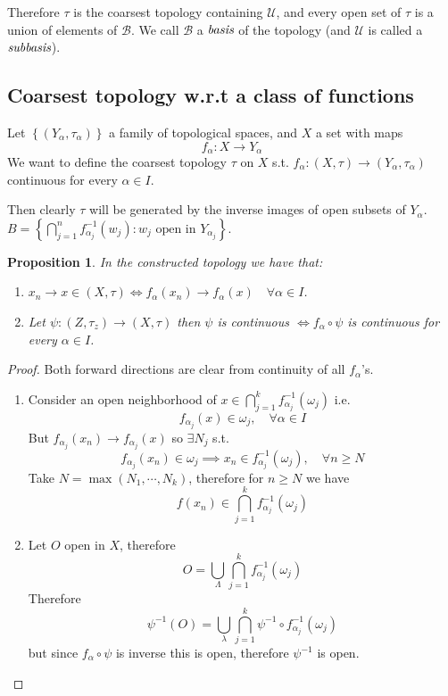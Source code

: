 \documentclass[11pt,a4paper]{article}
\theoremstyle{definition}
\theoremstyle{plain}
\newtheorem{proposition}[definition]{Proposition}
\theoremstyle{remark}
\renewcommand{\set}[1]{\left\{ #1 \right\}}
\newcommand{\1}{\mathbbm{1}}
\begin{document}
Therefore $\tau$ is the coarsest topology containing $\mathcal{U}$, and every open set of $\tau$ is a union of elements of $\mathcal{B}$. We call
$\mathcal{B}$ a $\emph{basis}$ of the topology (and $\mathcal{U}$ is called a $\emph{subbasis}$).

\subsection{Coarsest topology w.r.t a class of functions}

Let $\set{(Y_\alpha, \tau_\alpha)}$ a family of topological spaces, and $X$ a set with maps 
$$f_\alpha \colon X \to Y_\alpha$$
We want to define the coarsest topology $\tau$ on $X$ s.t. $f_\alpha \colon (X, \tau) \to (Y_\alpha, \tau_\alpha)$ continuous for every 
$\alpha \in I$. 

Then clearly $\tau$ will be generated by the inverse images of open subsets of $Y_\alpha$. $B = \set{\bigcap_{j=1}^n f_{\alpha_j}^{-1} (w_j) \colon w_j \text{ open in $Y_{\alpha_j}$}}$. 

\begin{proposition}
    In the constructed topology we have that: 
    \begin{enumerate}[label = \alph*)]
        \item $x_n \to x \in (X, \tau) \iff f_\alpha (x_n) \to f_\alpha (x) \quad \forall \alpha \in I$. 
        \item Let $\psi \colon (Z, \tau_z) \to (X, \tau)$ then $\psi$ is continuous $\iff f_\alpha \circ \psi$ is continuous for every $\alpha \in I$. 
    \end{enumerate}
\end{proposition}

\begin{proof}
    Both forward directions are clear from continuity of all $f_\alpha$'s. 
    \begin{enumerate}[label = \alph*)]
        \item Consider an open neighborhood of $x \in \bigcap_{j=1}^k f^{-1}_{\alpha_j} (\omega_j)$ i.e. 
        $$f_{\alpha_j}(x) \in \omega_j , \quad \forall \alpha \in I$$
        But $f_{\alpha_j}(x_n) \to f_{\alpha_j} (x)$ so $\exists N_j$ s.t. 
        $$f_{\alpha_j}(x_n) \in \omega_j \implies x_n \in f^{-1}_{\alpha_j}(\omega_j), \quad \forall n \ge N$$
        Take $N = \max (N_1, \cdots, N_k)$, therefore for $n \ge N$ we have 
        $$f(x_n) \in \bigcap_{j = 1}^k f^{-1}_{\alpha_j}(\omega_j)$$

        \item Let $O$ open in $X$, therefore 
        $$O = \bigcup_{\Lambda} \bigcap_{j=1}^k f_{\alpha_j}^{-1} (\omega_j)$$
        Therefore 
        $$\psi^{-1} (O) = \bigcup_{\lambda} \bigcap_{j=1}^k \psi^{-1} \circ f_{\alpha_j}^{-1} (\omega_j)$$
        but since $f_\alpha \circ \psi$ is inverse this is open, therefore $\psi^{-1}$ is open. 
    \end{enumerate}
\end{proof}
\end{document}
